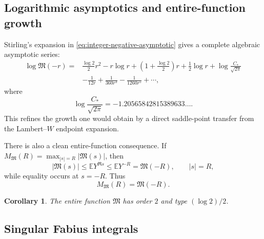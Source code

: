 \documentclass[11pt,oneside]{article}
\newtheorem{corollary}[theorem]{Corollary}
\theoremstyle{definition}
\newcommand{\M}{\mathfrak M}
\newcommand{\E}{\mathbb E}
\begin{document}
\subsection{Logarithmic asymptotics and entire-function growth}

Stirling's expansion in \cref{eq:integer-negative-asymptotic} gives a complete
algebraic asymptotic series:
\begin{align}
 \log\M(-r)
 ={}&\frac{\log2}{2}r^2-r\log r
 +\left(1+\frac{\log2}{2}\right)r
 +\frac12\log r
 +\log\frac{C_*}{\sqrt{2\pi}}
 \nonumber\\
 &-\frac1{12r}+\frac1{360r^3}-\frac1{1260r^5}+\cdots,
 \label{eq:log-negative-asymptotic}
\end{align}
where
\begin{equation}\label{eq:log-Cstar-numeric}
 \log\frac{C_*}{\sqrt{2\pi}}
 =-1.20565842815389633\ldots.
\end{equation}
This refines the growth one would obtain by a direct saddle-point transfer from the
Lambert--\(W\) endpoint expansion.

There is also a clean entire-function consequence.  If
\(M_{\M}(R)=\max_{|s|=R}|\M(s)|\), then
\begin{equation}\label{eq:maxmod-equality}
 |\M(s)|\le\E Y^{\Re s}\le\E Y^{-R}=\M(-R),
 \qquad |s|=R,
\end{equation}
while equality occurs at \(s=-R\).  Thus
\begin{equation}\label{eq:maxmod-exact}
 M_{\M}(R)=\M(-R).
\end{equation}

\begin{corollary}\label{cor:order-type}
The entire function \(\M\) has order \(2\) and type \((\log2)/2\).
\end{corollary}

\subsection{Singular Fabius integrals}
\end{document}
